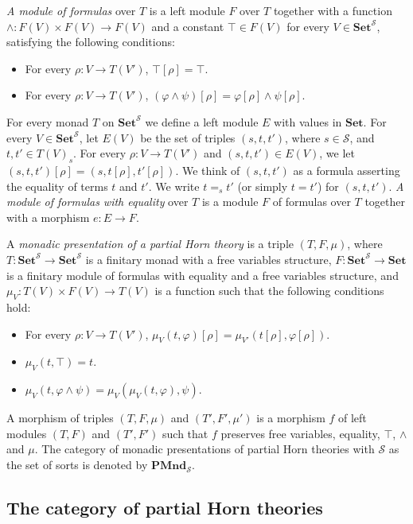 \documentclass[reqno]{amsart}
\theoremstyle{definition}
\theoremstyle{remark}
\newcommand{\cat}[1]{\mathbf{#1}}
\newcommand{\Set}{\cat{Set}}
\newcommand{\PMnd}{\cat{PMnd}}
\numberwithin{figure}{section}
\begin{document}
\emph{A module of formulas} over $T$ is a left module $F$ over $T$ together with a function
    $\land : F(V) \times F(V) \to F(V)$ and a constant $\top \in F(V)$ for every $V \in \Set^\mathcal{S}$, satisfying the following conditions:
\begin{itemize}
\item For every $\rho : V \to T(V')$, $\top[\rho] = \top$.
\item For every $\rho : V \to T(V')$, $(\varphi \land \psi)[\rho] = \varphi[\rho] \land \psi[\rho]$.
\end{itemize}

For every monad $T$ on $\Set^\mathcal{S}$ we define a left module $E$ with values in $\Set$.
For every $V \in \Set^\mathcal{S}$, let $E(V)$ be the set of triples $(s,t,t')$, where $s \in \mathcal{S}$, and $t,t' \in T(V)_s$.
For every $\rho : V \to T(V')$ and $(s,t,t') \in E(V)$, we let $(s,t,t')[\rho] = (s,t[\rho],t'[\rho])$.
We think of $(s,t,t')$ as a formula asserting the equality of terms $t$ and $t'$.
We write $t =_s t'$ (or simply $t = t'$) for $(s,t,t')$.
\emph{A module of formulas with equality} over $T$ is a module $F$ of formulas over $T$ together with a morphism $e : E \to F$.

\begin{defn}
A \emph{monadic presentation of a partial Horn theory} is a triple $(T,F,\mu)$, where
    $T : \Set^\mathcal{S} \to \Set^\mathcal{S}$ is a finitary monad with a free variables structure,
    $F : \Set^\mathcal{S} \to \Set$ is a finitary module of formulas with equality and a free variables structure, and
    $\mu_V : T(V) \times F(V) \to T(V)$ is a function such that the following conditions hold:
\begin{itemize}
\item For every $\rho : V \to T(V')$, $\mu_V(t,\varphi)[\rho] = \mu_{V'}(t[\rho],\varphi[\rho])$.
\item $\mu_V(t, \top) = t$.
\item $\mu_V(t, \varphi \land \psi) = \mu_V(\mu_V(t, \varphi), \psi)$.
\end{itemize}
A morphism of triples $(T,F,\mu)$ and $(T',F',\mu')$ is a morphism $f$ of left modules $(T,F)$ and $(T',F')$ such that $f$ preserves free variables, equality, $\top$, $\land$ and $\mu$.
The category of monadic presentations of partial Horn theories with $\mathcal{S}$ as the set of sorts is denoted by $\PMnd_\mathcal{S}$.
\end{defn}

\subsection{The category of partial Horn theories}
\label{sec:PHT-rules}
\end{document}
